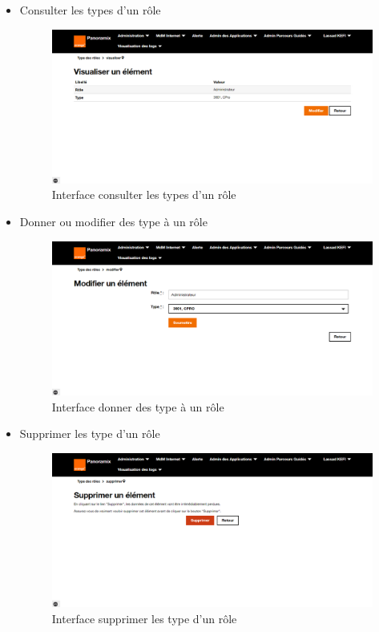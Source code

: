 \begin{itemize}
	\item Consulter les types d'un rôle 
	\begin{figure}[H]
		\centering
		\includegraphics[width=0.8\linewidth]{"img/screenshots/type roles/view"}
		\caption[Interface voir les types d'un rôle]{Interface consulter les types d'un rôle}
		\label{fig:view-tr}
	\end{figure}
	\newpage
	\item Donner ou modifier des type à un rôle
	\begin{figure}[H]
		\centering
		\includegraphics[width=0.7\linewidth]{"img/screenshots/type roles/update"}
		\caption[Interface donner des type à un rôle]{Interface donner des type à un rôle}
		\label{fig:create-tr}
	\end{figure}
	
	\item Supprimer les type d'un rôle 
	\begin{figure}[H]
		\centering
		\includegraphics[width=0.7\linewidth]{"img/screenshots/type roles/delete"}
		\caption[Interface supprimer les type d'un rôle]{Interface supprimer les type d'un rôle}
		\label{fig:delete-tr}
	\end{figure}
\end{itemize}
